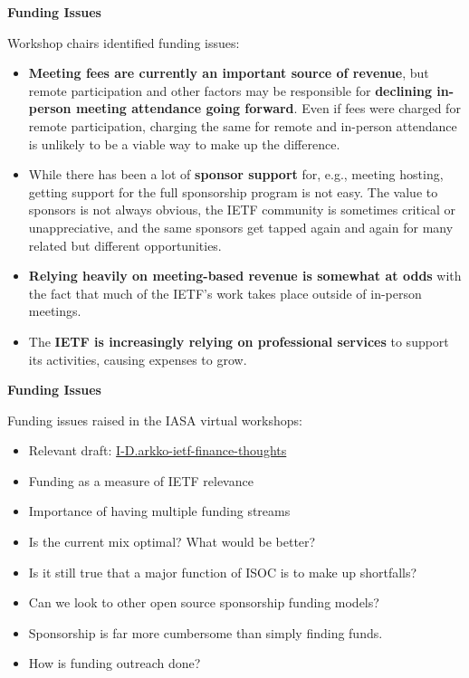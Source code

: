 \documentclass[helvetica]{seminar}
\newcommand{\heading}[1]{%
  \begin{center} 
    \large\bf 
    #1 
  \end{center} 
  \vspace{.4 in}}
\begin{document}
\begin{slide}
\heading{Funding Issues}

Workshop chairs identified funding issues:
{\footnotesize
\begin{itemize}
\item \textbf{Meeting fees are currently an important source of
  revenue}, but remote participation and other factors may be
  responsible for \textbf{declining in-person meeting attendance going
    forward}.  Even if fees were charged for remote participation,
  charging the same for remote and in-person attendance is unlikely to
  be a viable way to make up the difference.
\item While there has been a lot of \textbf{sponsor support} for,
  e.g., meeting hosting, getting support for the full sponsorship
  program is not easy.  The value to sponsors is not always obvious,
  the IETF community is sometimes critical or unappreciative, and the
  same sponsors get tapped again and again for many related but
  different opportunities.
\item \textbf{Relying heavily on meeting-based revenue is somewhat at
  odds} with the fact that much of the IETF's work takes place outside
  of in-person meetings.
\item The \textbf{IETF is increasingly relying on professional
  services} to support its activities, causing expenses to grow.
\end{itemize}
}

\end{slide}

\begin{slide}
\heading{Funding Issues}

Funding issues raised in the IASA virtual workshops:
\begin{itemize}
\item Relevant draft: \href{https://tools.ietf.org/html/draft-arkko-ietf-finance-thoughts-00}{I-D.arkko-ietf-finance-thoughts}
\item Funding as a measure of IETF relevance
\item Importance of having multiple funding streams
\item Is the current mix optimal? What would be better?
\item Is it still true that a major function of ISOC is to make up
  shortfalls?
\item Can we look to other open source sponsorship funding models?
\item Sponsorship is far more cumbersome than simply finding funds.
\item How is funding outreach done?
\end{itemize}

\end{slide}
\end{document}
